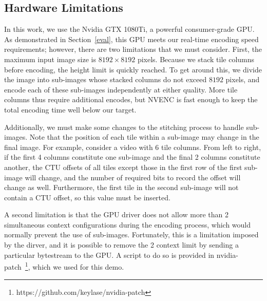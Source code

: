 \subsection{Hardware Limitations}

In this work, we use the Nvidia GTX 1080Ti, a powerful consumer-grade GPU. As demonstrated in Section~\ref{eval}, this GPU meets our real-time encoding speed requirements; however, there are two limitations that we must consider.
%
First, the maximum input image size is $8192\times8192$ pixels. Because we stack tile columns before encoding, the height limit is quickly reached. To get around this, we divide the image into sub-images whose stacked columns do not exceed $8192$ pixels, and encode each of these sub-images independently at either quality. More tile columns thus require additional encodes, but NVENC is fast enough to keep the total encoding time well below our target.

Additionally, we must make some changes to the stitching process to handle sub-images. Note that the position of each tile within a sub-image may change in the final image. For example, consider a video with 6 tile columns. From left to right, if the first 4 columns constitute one sub-image and the final 2 columns constitute another, the CTU offsets of all tiles except those in the first row of the first sub-image will change, and the number of required bits to record the offset will change as well. Furthermore, the first tile in the second sub-image will not contain a CTU offset, so this value must be inserted.

A second limitation is that the GPU driver does not allow more than 2 simultaneous context configurations during the encoding process, which would normally prevent the use of sub-images. Fortunately, this is a limitation imposed by the dirver, and it is possible to remove the 2 context limit by sending a particular bytestream to the GPU. A script to do so is provided in nvidia-patch~\footnote{https://github.com/keylase/nvidia-patch}, which we used for this demo.








